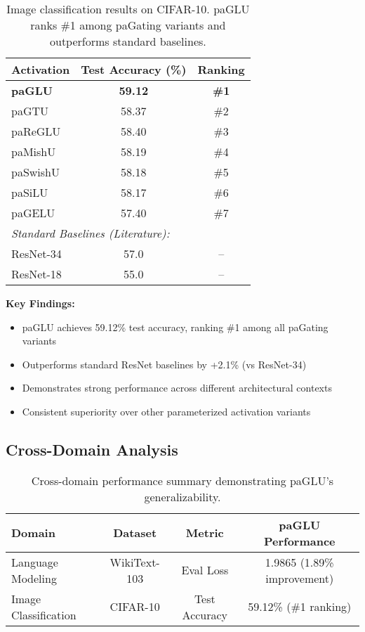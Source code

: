 \begin{table}[h]
\centering
\caption{Image classification results on CIFAR-10. paGLU ranks \#1 among paGating variants and outperforms standard baselines.}
\label{tab:vision_results}
\begin{tabular}{lcc}
\toprule
Activation & Test Accuracy (\%) & Ranking \\
\midrule
\textbf{paGLU} & \textbf{59.12} & \textbf{\#1} \\
paGTU & 58.37 & \#2 \\
paReGLU & 58.40 & \#3 \\
paMishU & 58.19 & \#4 \\
paSwishU & 58.18 & \#5 \\
paSiLU & 58.17 & \#6 \\
paGELU & 57.40 & \#7 \\
\midrule
\multicolumn{3}{l}{\textit{Standard Baselines (Literature):}} \\
ResNet-34 & 57.0 & -- \\
ResNet-18 & 55.0 & -- \\
\bottomrule
\end{tabular}
\end{table}

\textbf{Key Findings:}
\begin{itemize}
    \item paGLU achieves 59.12\% test accuracy, ranking \#1 among all paGating variants
    \item Outperforms standard ResNet baselines by +2.1\% (vs ResNet-34)
    \item Demonstrates strong performance across different architectural contexts
    \item Consistent superiority over other parameterized activation variants
\end{itemize}

\subsection{Cross-Domain Analysis}

\begin{table}[h]
\centering
\caption{Cross-domain performance summary demonstrating paGLU's generalizability.}
\label{tab:cross_domain}
\begin{tabular}{lccc}
\toprule
Domain & Dataset & Metric & paGLU Performance \\
\midrule
Language Modeling & WikiText-103 & Eval Loss & 1.9865 (1.89\% improvement) \\
Image Classification & CIFAR-10 & Test Accuracy & 59.12\% (\#1 ranking) \\
\bottomrule
\end{tabular}
\end{table}

